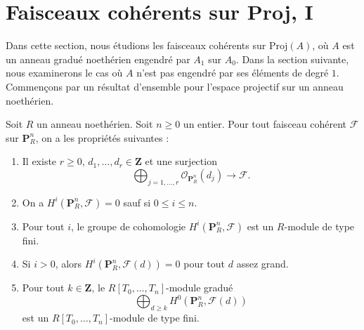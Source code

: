 \section{Faisceaux cohérents sur Proj, I}
\label{section-coherent-proj}

\noindent
Dans cette section, nous étudions les faisceaux cohérents sur $\text{Proj}(A)$,
où $A$ est un anneau gradué noethérien engendré par $A_1$ sur $A_0$.
Dans la section suivante, nous examinerons le cas où $A$ n'est pas engendré par ses
éléments de degré $1$. Commençons par un résultat d'ensemble pour
l'espace projectif sur un anneau noethérien.

\begin{lemma}
\label{lemma-coherent-projective}
Soit $R$ un anneau noethérien.
Soit $n \geq 0$ un entier. Pour
tout faisceau cohérent $\mathcal{F}$ sur $\mathbf{P}^n_R$,
on a les propriétés suivantes :
\begin{enumerate}
\item Il existe $r \geq 0$,
$d_1, \ldots, d_r \in \mathbf{Z}$ et une surjection
$$
\bigoplus\nolimits_{j = 1, \ldots, r}
\mathcal{O}_{\mathbf{P}^n_R}(d_j)
\longrightarrow
\mathcal{F}.
$$
\item On a $H^i(\mathbf{P}^n_R, \mathcal{F}) = 0$ sauf si
$0 \leq i \leq n$.
\item Pour tout $i$, le groupe de cohomologie $H^i(\mathbf{P}^n_R, \mathcal{F})$
est un $R$-module de type fini.
\item Si $i > 0$, alors
$H^i(\mathbf{P}^n_R, \mathcal{F}(d)) = 0$ pour tout $d$ assez grand.
\item Pour tout $k \in \mathbf{Z}$, le $R[T_0, \ldots, T_n]$-module gradué
$$
\bigoplus\nolimits_{d \geq k} H^0(\mathbf{P}^n_R, \mathcal{F}(d))
$$
est un $R[T_0, \ldots, T_n]$-module de type fini.
\end{enumerate}
\end{lemma}

